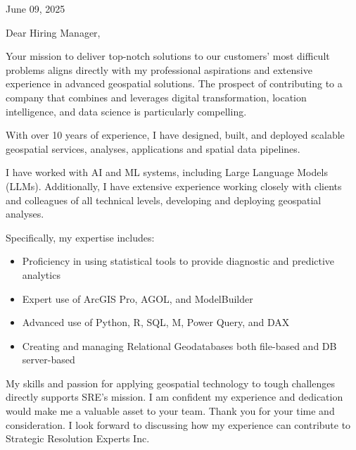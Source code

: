 \documentclass[letterpaper]{article}
\newenvironment{itemlist}
        {
            \vspace{-12pt}
            \begin{itemize} \itemsep 0pt
        }{
            \end{itemize}
            \vspace{-3pt}
        }
\begin{document}
\large

\null\hfill June 09, 2025

Dear Hiring Manager,

Your mission to
deliver top-notch solutions to our customers’ most difficult problems
aligns directly with my professional aspirations and extensive experience in advanced geospatial solutions.
The prospect of contributing to a company that combines and leverages
digital transformation, location intelligence, and data science
is particularly compelling.

With over 10 years of experience, I have designed, built, and deployed scalable
geospatial services, analyses, applications and spatial data pipelines.

I have worked with AI and ML systems, including Large Language Models (LLMs).
Additionally, I have extensive experience working closely with clients and colleagues
of all technical levels, developing and deploying geospatial analyses.

Specifically, my expertise includes:  
\begin{itemlist}
\item Proficiency in using statistical tools to provide diagnostic and predictive analytics
\item Expert use of ArcGIS Pro, AGOL, and ModelBuilder
\item Advanced use of Python, R, SQL, M, Power Query, and DAX
\item Creating and managing Relational Geodatabases both file-based and DB server-based
\end{itemlist}

My skills and passion for applying geospatial technology to tough
challenges directly supports SRE’s mission. 
I am confident my experience and dedication would make me a valuable asset to your team. 
Thank you for your time and consideration. 
I look forward to discussing how my experience can contribute to Strategic Resolution Experts Inc.
\end{document}
